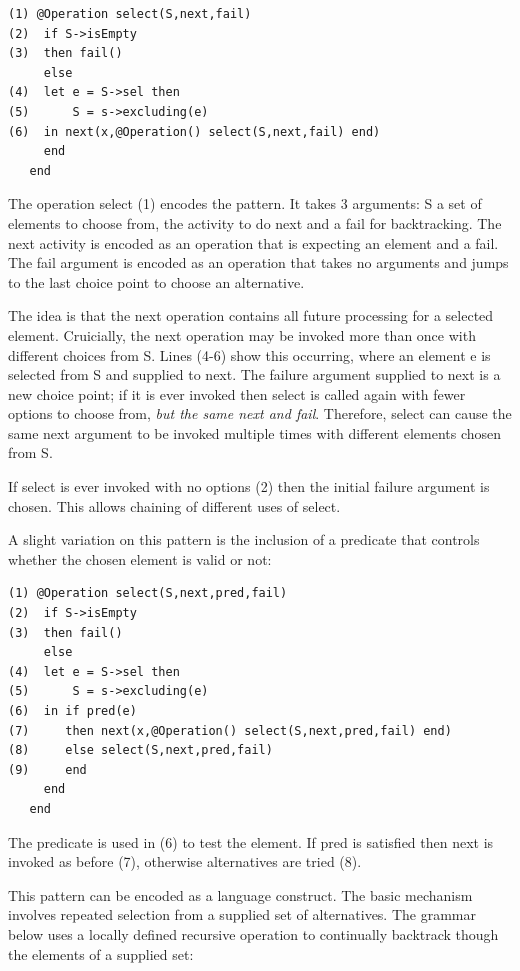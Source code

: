 \begin{lstlisting}
(1) @Operation select(S,next,fail)
(2)  if S->isEmpty
(3)  then fail()
     else
(4)  let e = S->sel then
(5)      S = s->excluding(e)
(6)  in next(x,@Operation() select(S,next,fail) end)
     end
   end
\end{lstlisting}The operation select (1) encodes the pattern. It takes 3 arguments:
S a set of elements to choose from, the activity to do next and a
fail for backtracking. The next activity is encoded as an operation
that is expecting an element and a fail. The fail argument is encoded
as an operation that takes no arguments and jumps to the last choice
point to choose an alternative.

The idea is that the next operation contains all future processing
for a selected element. Cruicially, the next operation may be invoked
more than once with different choices from S. Lines (4-6) show this
occurring, where an element e is selected from S and supplied to next.
The failure argument supplied to next is a new choice point; if it
is ever invoked then select is called again with fewer options to
choose from, \textit{but the same next and fail}. Therefore, select
can cause the same next argument to be invoked multiple times with
different elements chosen from S.

If select is ever invoked with no options (2) then the initial failure
argument is chosen. This allows chaining of different uses of select.

A slight variation on this pattern is the inclusion of a predicate
that controls whether the chosen element is valid or not:

\begin{lstlisting}
(1) @Operation select(S,next,pred,fail)
(2)  if S->isEmpty
(3)  then fail()
     else
(4)  let e = S->sel then
(5)      S = s->excluding(e)
(6)  in if pred(e)
(7)     then next(x,@Operation() select(S,next,pred,fail) end)
(8)     else select(S,next,pred,fail)
(9)     end
     end
   end
\end{lstlisting}The predicate is used in (6) to test the element. If pred is satisfied
then next is invoked as before (7), otherwise alternatives are tried
(8).

This pattern can be encoded as a language construct. The basic mechanism
involves repeated selection from a supplied set of alternatives. The
grammar below uses a locally defined recursive operation to continually
backtrack though the elements of a supplied set:


